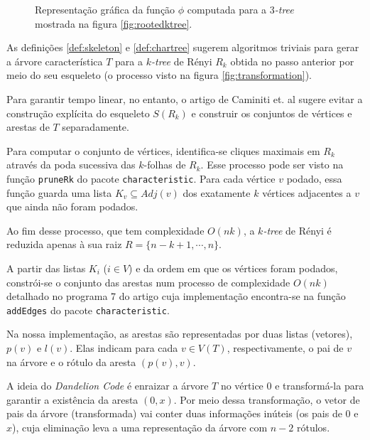 \begin{algorithm}
\begin{step}
\begin{figure}
      \caption{Representação gráfica da função $\phi$ computada para a \emph{$3$-tree} mostrada na figura \ref{fig:rootedktree}.}
      \label{fig:phi}
    \end{figure}
  \end{step}

  \begin{step}
    As definições \ref{def:skeleton} e \ref{def:chartree} sugerem algoritmos triviais para gerar a árvore característica $T$ para a \emph{$k$-tree} de Rényi $R_k$ obtida no passo anterior por meio do seu esqueleto (o processo visto na figura \ref{fig:transformation}).

    Para garantir tempo linear, no entanto, o artigo de Caminiti et. al \cite{caminiti} sugere evitar a construção explícita do esqueleto $S(R_k)$ e construir os conjuntos de vértices e arestas de $T$ separadamente.

    Para computar o conjunto de vértices, identifica-se cliques maximais em $R_k$ através da poda sucessiva das $k$-folhas de $R_k$. Esse processo pode ser visto na função {\tt pruneRk} do pacote {\tt characteristic}. Para cada vértice $v$ podado, essa função guarda uma lista $K_v \subseteq Adj(v)$ dos exatamente $k$ vértices adjacentes a $v$ que ainda não foram podados.

    Ao fim desse processo, que tem complexidade $O(nk)$, a \emph{$k$-tree} de Rényi é reduzida apenas à sua raiz $R = \{n-k+1, \cdots, n\}$.

    A partir das listas $K_i$ ($i \in V$) e da ordem em que os vértices foram podados, constrói-se o conjunto das arestas num processo de complexidade $O(nk)$ detalhado no programa 7 do artigo \cite{caminiti} cuja implementação encontra-se na função {\tt addEdges} do pacote {\tt characteristic}.

    Na nossa implementação, as arestas são representadas por duas listas (vetores), $p(v)$ e $l(v)$. Elas indicam para cada $v \in V(T)$, respectivamente, o pai de $v$ na árvore e o rótulo da aresta $(p(v), v)$.
  \end{step}

  \begin{step}
    A ideia do \emph{Dandelion Code} é enraizar a árvore $T$ no vértice $0$ e transformá-la para garantir a existência da aresta $(0, x)$. Por meio dessa transformação, o vetor de pais da árvore (transformada) vai conter duas informações inúteis (os pais de $0$ e $x$), cuja eliminação leva a uma representação da árvore com $n - 2$ rótulos.


\end{step}
\end{algorithm}
